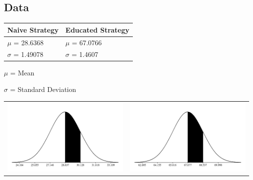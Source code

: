 \documentclass[preprint,12pt]{elsarticle}
\begin{document}
\subsection{Data}
\begin{center}
	\begin{tabular}{l | l}
		Naive Strategy & Educated Strategy \\ \hline
		\textbf{$\mu$} = 28.6368 & \textbf{$\mu$} = 67.0766  \\
		\textbf{$\sigma$} = 1.49078 & \textbf{$\sigma$} = 1.4607 \\ 
	\end{tabular}

	\vspace{4 mm}

	\textbf{$\mu$} = Mean

	\textbf{$\sigma$} = Standard Deviation

	\vspace{4 mm}

	\begin{tabular}{c c}
		\includegraphics[scale=0.37]{../images/dumbCurve.png} & \includegraphics[scale=0.37]{../images/smartCurve.png} \\
	\end{tabular}


\end{center}
\end{document}
